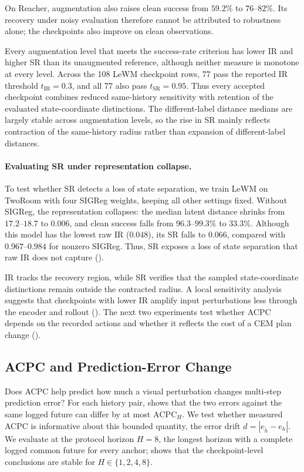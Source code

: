 \documentclass[10pt]{article}
\begin{document}
On Reacher, augmentation also raises clean success from $59.2\%$ to
$76$--$82\%$. Its recovery under noisy evaluation therefore cannot be
attributed to robustness alone; the checkpoints also improve on clean
observations.

Every augmentation level that meets the success-rate criterion has lower IR
and higher SR than its unaugmented reference, although neither measure is
monotone at every level. Across the 108 LeWM checkpoint rows, 77 pass the
reported IR threshold $t_{\mathrm{IR}}=0.3$, and all 77 also pass
$t_{\mathrm{SR}}=0.95$. Thus every accepted checkpoint combines reduced same-history sensitivity with retention
of the evaluated state-coordinate distinctions. The different-label distance
medians are largely stable across augmentation levels, so the rise in SR
mainly reflects contraction of the same-history radius rather than expansion
of different-label distances.

\paragraph{Evaluating SR under representation collapse.}
To test whether SR detects a loss of state separation, we train LeWM on
TwoRoom with four SIGReg weights, keeping all other settings fixed. Without
SIGReg, the representation collapses: the median latent distance shrinks from
$17.2$--$18.7$ to $0.006$, and clean success falls from $96.3$--$99.3\%$ to
$33.3\%$. Although this model has the lowest raw IR ($0.048$), its SR falls
to $0.066$, compared with $0.967$--$0.984$ for nonzero SIGReg. Thus, SR
exposes a loss of state separation that raw IR does not capture
().

IR tracks the recovery region, while SR verifies that the sampled
state-coordinate distinctions remain outside the contracted radius. A
local sensitivity analysis suggests that checkpoints with lower IR amplify
input perturbations less through the encoder and rollout
(). The next two experiments test whether
ACPC depends on the recorded actions and whether it reflects the cost of a
CEM plan change
().
\FloatBarrier

\subsection{ACPC and Prediction-Error Change}\label{sec:exp-target-aligned}

Does ACPC help predict how much a visual perturbation changes multi-step
prediction error? For each history pair, 
shows that the two errors against the same logged future can differ by at most
$\mathrm{ACPC}_H$. We test whether measured ACPC is informative about this
bounded quantity, the error drift $d=|e_{\tilde h}-e_h|$. We evaluate at the protocol horizon
$H=8$, the longest horizon with a complete logged common future for every
anchor;  shows that the
checkpoint-level conclusions are stable for $H\in\{1,2,4,8\}$.
\end{document}

